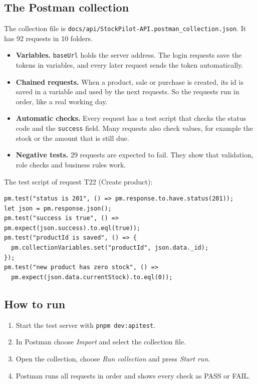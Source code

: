 \documentclass[11pt,a4paper]{article}
\newcommand{\code}[1]{\texttt{#1}}
\begin{document}
\subsection{The Postman collection}
The collection file is \code{docs/api/StockPilot-API.postman\_collection.json}. It has 92 requests in 10 folders.
\begin{itemize}
  \item \textbf{Variables.} \code{baseUrl} holds the server address. The login requests save the tokens in variables, and every later request sends the token automatically.
  \item \textbf{Chained requests.} When a product, sale or purchase is created, its id is saved in a variable and used by the next requests. So the requests run in order, like a real working day.
  \item \textbf{Automatic checks.} Every request has a test script that checks the status code and the \code{success} field. Many requests also check values, for example the stock or the amount that is still due.
  \item \textbf{Negative tests.} 29 requests are expected to fail. They show that validation, role checks and business rules work.
\end{itemize}
The test script of request T22 (Create product):
\begin{lstlisting}[style=query]
pm.test("status is 201", () => pm.response.to.have.status(201));
let json = pm.response.json();
pm.test("success is true", () => pm.expect(json.success).to.eql(true));
pm.test("productId is saved", () => {
  pm.collectionVariables.set("productId", json.data._id);
});
pm.test("new product has zero stock", () =>
  pm.expect(json.data.currentStock).to.eql(0));
\end{lstlisting}

\subsection{How to run}
\begin{enumerate}
  \item Start the test server with \code{pnpm dev:apitest}.
  \item In Postman choose \emph{Import} and select the collection file.
  \item Open the collection, choose \emph{Run collection} and press \emph{Start run}.
  \item Postman runs all requests in order and shows every check as PASS or FAIL.
\end{enumerate}
\end{document}
